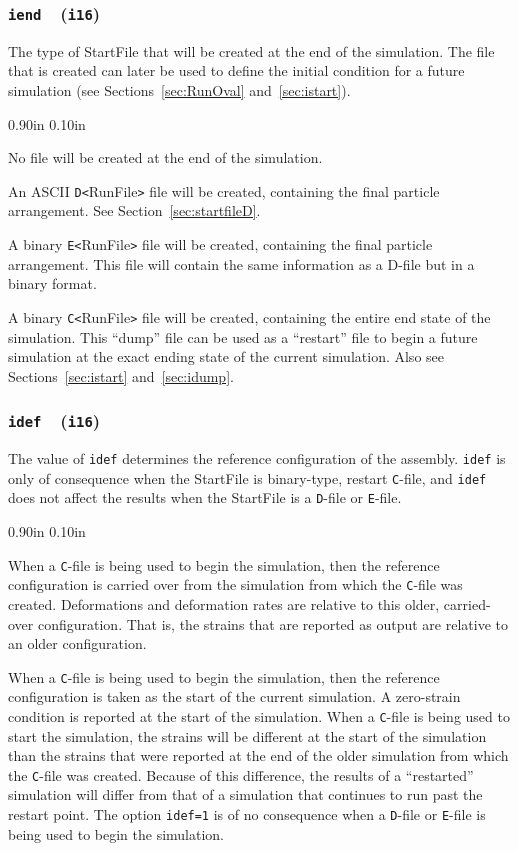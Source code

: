 \documentclass[letterpaper,11pt]{article}
\newcommand{\Var}[2]{\texttt{#1}\ \  (\texttt{#2})}
\newlength{\Labelwidth}
\newcommand{\Entrylabel}[1]{\makebox[\Labelwidth][r]{\texttt{#1}}}
\newenvironment{Options}
{\begin{list}{}{%
\renewcommand{\makelabel}{\Entrylabel}%
\setlength{\leftmargin} {0.90in}%
\setlength{\rightmargin}{0.00in}%
\setlength{\labelsep}   {0.10in}%
\setlength{\labelwidth} {\Labelwidth}%
}}
{\end{list}}
\begin{document}
\subsubsection[\texttt{iend}]{\Var{iend}{i16}}\label{sec:iend}
The type of \textsf{StartFile} that will be created at the
end of the simulation.
The file that is created can later be used to define the
initial condition for a future simulation 
(see Sections~\ref{sec:RunOval} and~\ref{sec:istart}).
\begin{Options}
\item[iend=0]
No file will be created at the end of the simulation.
\item[iend=1]
An ASCII \mbox{\texttt{D<}\textsf{RunFile}\texttt{>}} file
will be created, containing the final particle arrangement.
See Section~\ref{sec:startfileD}.
\item[iend=2]
A binary \mbox{\texttt{E<}\textsf{RunFile}\texttt{>}} file
will be created, containing the final particle arrangement.
This file will contain the same information as a D-file but in a 
binary format.
\item[iend=3]
A binary \mbox{\texttt{C<}\textsf{RunFile}\texttt{>}} file
will be created, containing the entire end state of the simulation.
This ``dump'' file can be used as a ``restart'' file to begin a future
simulation at the exact ending state
of the current simulation.
Also see Sections~\ref{sec:istart} and~\ref{sec:idump}.
\end{Options}
%
\subsubsection[\texttt{idef}]{\Var{idef}{i16}}\label{sec:idef}
The value of \texttt{idef} determines the reference configuration
of the assembly. 
\texttt{idef} is only of consequence when the
\textsf{StartFile} is binary-type, restart \texttt{C}-file, and
\texttt{idef} does not affect the results when the \textsf{StartFile} is 
a \texttt{D}-file or \texttt{E}-file.
\begin{Options}
\item[idef=0]
When a \texttt{C}-file is being used to begin the simulation,
then the reference configuration is carried over from the 
simulation from which the \texttt{C}-file was created.
Deformations and deformation rates are relative 
to this older, carried-over configuration.  That is, the strains
that are reported as output are relative to an older configuration.
\item[idef=1]
When a \texttt{C}-file is being used to begin the simulation,
then the reference configuration is taken as the start of the current
simulation.
A zero-strain condition is reported at the start of the simulation.
When a \texttt{C}-file is being used to start the simulation, the strains
will be different at the start of the simulation than the strains that
were reported at the end of the older simulation from which
the \texttt{C}-file was created.
Because of this difference, the results of a ``restarted'' simulation will
differ from that of a simulation that continues to run past the 
restart point.
The option \texttt{idef=1} is of no consequence when 
a \texttt{D}-file or \texttt{E}-file is being used to begin the simulation.
\end{Options}
%
\end{document}
